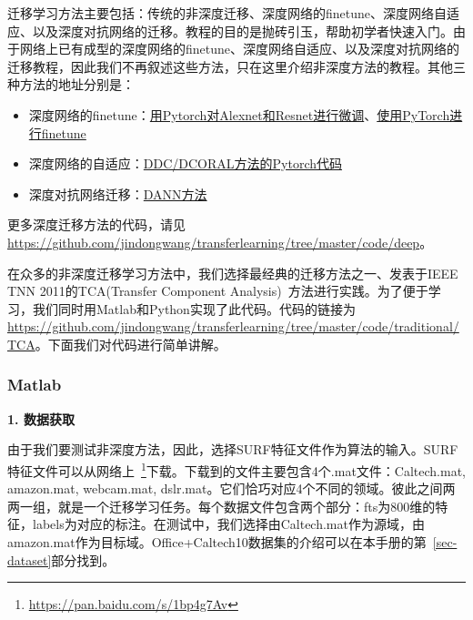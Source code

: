 迁移学习方法主要包括：传统的非深度迁移、深度网络的finetune、深度网络自适应、以及深度对抗网络的迁移。教程的目的是抛砖引玉，帮助初学者快速入门。由于网络上已有成型的深度网络的finetune、深度网络自适应、以及深度对抗网络的迁移教程，因此我们不再叙述这些方法，只在这里介绍非深度方法的教程。其他三种方法的地址分别是：

\begin{itemize}
	\item 深度网络的finetune：\href{https://github.com/jindongwang/transferlearning/tree/master/code/deep/finetune_AlexNet_ResNet}{用Pytorch对Alexnet和Resnet进行微调}、\href{https://pytorch.org/tutorials/beginner/transfer_learning_tutorial.html}{使用PyTorch进行finetune}
	\item 深度网络的自适应：\href{https://github.com/jindongwang/transferlearning/tree/master/code/deep/DDC_DeepCoral}{DDC/DCORAL方法的Pytorch代码}
	\item 深度对抗网络迁移：\href{https://github.com/jindongwang/transferlearning/tree/master/code/deep/DANN(RevGrad)}{DANN方法}
\end{itemize}

更多深度迁移方法的代码，请见\url{https://github.com/jindongwang/transferlearning/tree/master/code/deep}。


在众多的非深度迁移学习方法中，我们选择最经典的迁移方法之一、发表于IEEE TNN 2011的TCA(Transfer Component Analysis)~\cite{pan2011domain}方法进行实践。为了便于学习，我们同时用Matlab和Python实现了此代码。代码的链接为\url{https://github.com/jindongwang/transferlearning/tree/master/code/traditional/TCA}。下面我们对代码进行简单讲解。

\subsubsection{Matlab}

\textbf{1. 数据获取}

由于我们要测试非深度方法，因此，选择SURF特征文件作为算法的输入。SURF特征文件可以从网络上~\footnote{\url{https://pan.baidu.com/s/1bp4g7Av}}下载。下载到的文件主要包含4个.mat文件：Caltech.mat, amazon.mat, webcam.mat, dslr.mat。它们恰巧对应4个不同的领域。彼此之间两两一组，就是一个迁移学习任务。每个数据文件包含两个部分：fts为800维的特征，labels为对应的标注。在测试中，我们选择由Caltech.mat作为源域，由amazon.mat作为目标域。Office+Caltech10数据集的介绍可以在本手册的第~\ref{sec-dataset}部分找到。


